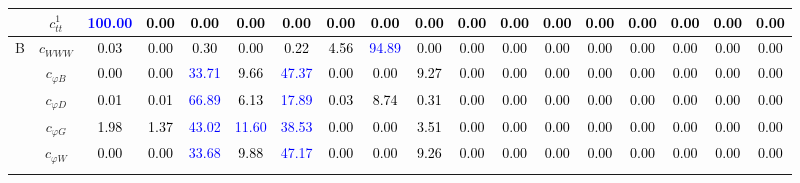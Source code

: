 \documentclass{article}
\begin{document}
\begin{landscape}
\begin{table}[H]
\begin{tabular}{|c|c|c|c|c|c|c|c|c|c|c|c|c|c|c|c|c|c|}
 & $c_{tt}^{1}$ & \textcolor{blue}{100.00} & \textcolor{black}{0.00} & \textcolor{black}{0.00} & \textcolor{black}{0.00} & \textcolor{black}{0.00} & \textcolor{black}{0.00} & \textcolor{black}{0.00} & \textcolor{black}{0.00} & \textcolor{black}{0.00} & \textcolor{black}{0.00} & \textcolor{black}{0.00} & \textcolor{black}{0.00} & \textcolor{black}{0.00} & \textcolor{black}{0.00} & \textcolor{black}{0.00} & \textcolor{black}{0.00}\\ \hline
\multirow{7}{*}{B}
 & $c_{WWW}$ & \textcolor{black}{0.03} & \textcolor{black}{0.00} & \textcolor{black}{0.30} & \textcolor{black}{0.00} & \textcolor{black}{0.22} & \textcolor{black}{4.56} & \textcolor{blue}{94.89} & \textcolor{black}{0.00} & \textcolor{black}{0.00} & \textcolor{black}{0.00} & \textcolor{black}{0.00} & \textcolor{black}{0.00} & \textcolor{black}{0.00} & \textcolor{black}{0.00} & \textcolor{black}{0.00} & \textcolor{black}{0.00}\\ \cline{2-18}
 & $c_{\varphi B}$ & \textcolor{black}{0.00} & \textcolor{black}{0.00} & \textcolor{blue}{33.71} & \textcolor{black}{9.66} & \textcolor{blue}{47.37} & \textcolor{black}{0.00} & \textcolor{black}{0.00} & \textcolor{black}{9.27} & \textcolor{black}{0.00} & \textcolor{black}{0.00} & \textcolor{black}{0.00} & \textcolor{black}{0.00} & \textcolor{black}{0.00} & \textcolor{black}{0.00} & \textcolor{black}{0.00} & \textcolor{black}{0.00}\\ \cline{2-18}
 & $c_{\varphi D}$ & \textcolor{black}{0.01} & \textcolor{black}{0.01} & \textcolor{blue}{66.89} & \textcolor{black}{6.13} & \textcolor{blue}{17.89} & \textcolor{black}{0.03} & \textcolor{black}{8.74} & \textcolor{black}{0.31} & \textcolor{black}{0.00} & \textcolor{black}{0.00} & \textcolor{black}{0.00} & \textcolor{black}{0.00} & \textcolor{black}{0.00} & \textcolor{black}{0.00} & \textcolor{black}{0.00} & \textcolor{black}{0.00}\\ \cline{2-18}
 & $c_{\varphi G}$ & \textcolor{black}{1.98} & \textcolor{black}{1.37} & \textcolor{blue}{43.02} & \textcolor{blue}{11.60} & \textcolor{blue}{38.53} & \textcolor{black}{0.00} & \textcolor{black}{0.00} & \textcolor{black}{3.51} & \textcolor{black}{0.00} & \textcolor{black}{0.00} & \textcolor{black}{0.00} & \textcolor{black}{0.00} & \textcolor{black}{0.00} & \textcolor{black}{0.00} & \textcolor{black}{0.00} & \textcolor{black}{0.00}\\ \cline{2-18}
 & $c_{\varphi W}$ & \textcolor{black}{0.00} & \textcolor{black}{0.00} & \textcolor{blue}{33.68} & \textcolor{black}{9.88} & \textcolor{blue}{47.17} & \textcolor{black}{0.00} & \textcolor{black}{0.00} & \textcolor{black}{9.26} & \textcolor{black}{0.00} & \textcolor{black}{0.00} & \textcolor{black}{0.00} & \textcolor{black}{0.00} & \textcolor{black}{0.00} & \textcolor{black}{0.00} & \textcolor{black}{0.00} & \textcolor{black}{0.00}\\ \cline{2-18}

\end{tabular}
\end{table}
\end{landscape}
\end{document}
